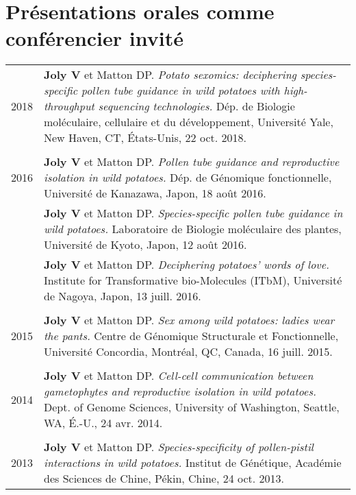 \documentclass[letterpaper,12pt]{article}
\begin{document}
\vspace{6mm}

\section[Conférencier invité]{Présentations orales \small comme conférencier invité}
\begin{tabularx}{\textwidth}{@{}r|X@{}}

2018
& \textbf{Joly V} et Matton DP.
  \emph{Potato sexomics: deciphering species-specific pollen tube guidance in wild potatoes with high-throughput sequencing technologies.}
  Dép. de Biologie moléculaire, cellulaire et du développement,
  Université Yale, New Haven, CT, États-Unis, 22 oct. 2018.
  \\

\multicolumn{2}{c}{} \\

2016
& \textbf{Joly V} et Matton DP.
  \emph{Pollen tube guidance and reproductive isolation in wild potatoes.}
  Dép. de Génomique fonctionnelle,
  Université de Kanazawa, Japon, 18 août 2016.
  \vspace{1.5mm} \\

& \textbf{Joly V} et Matton DP.
  \emph{Species-specific pollen tube guidance in wild potatoes.}
  Laboratoire de Biologie moléculaire des plantes,
  Université de Kyoto, Japon, 12 août 2016.
  \vspace{1.5mm} \\

& \textbf{Joly V} et Matton DP.
  \emph{Deciphering potatoes’ words of love.}
  Institute for Transformative bio-Molecules (ITbM),
  Université de Nagoya, Japon, 13 juill. 2016.
  \\

\multicolumn{2}{c}{} \\

2015
& \textbf{Joly V} et Matton DP.
  \emph{Sex among wild potatoes: ladies wear the pants.}
  Centre de Génomique Structurale et Fonctionnelle, Université Concordia, Montréal, QC, Canada, 16 juill. 2015.
  \\

\multicolumn{2}{c}{} \\

2014
& \textbf{Joly V} et Matton DP.
  \emph{Cell-cell communication between gametophytes and reproductive isolation in wild potatoes.}
  Dept. of Genome Sciences, University of Washington,
  Seattle, WA, É.-U., 24 avr. 2014.
  \\

\multicolumn{2}{c}{} \\

2013
& \textbf{Joly V} et Matton DP.
  \emph{Species-specificity of pollen-pistil interactions in wild potatoes.}
  Institut de Génétique, Académie des Sciences de Chine,
  Pékin, Chine, 24 oct. 2013. \\

\end{tabularx}
\end{document}
